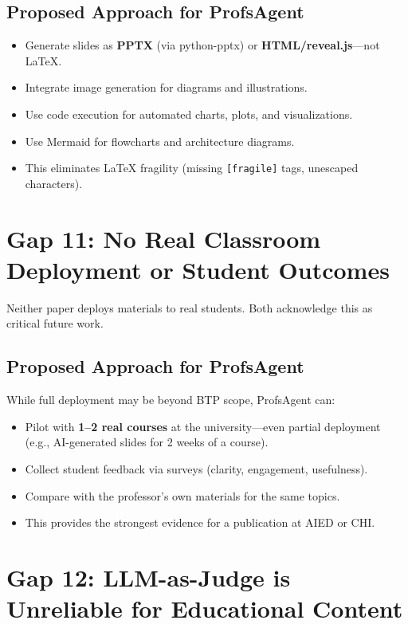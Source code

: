 \documentclass[11pt,a4paper]{article}
\begin{document}
\subsection{Proposed Approach for ProfsAgent}
\begin{itemize}[nosep]
    \item Generate slides as \textbf{PPTX} (via python-pptx) or \textbf{HTML/reveal.js}---not LaTeX.
    \item Integrate image generation for diagrams and illustrations.
    \item Use code execution for automated charts, plots, and visualizations.
    \item Use Mermaid for flowcharts and architecture diagrams.
    \item This eliminates LaTeX fragility (missing \texttt{[fragile]} tags, unescaped characters).
\end{itemize}

\section{Gap 11: No Real Classroom Deployment or Student Outcomes}

Neither paper deploys materials to real students. Both acknowledge this as critical future work.

\subsection{Proposed Approach for ProfsAgent}
While full deployment may be beyond BTP scope, ProfsAgent can:
\begin{itemize}[nosep]
    \item Pilot with \textbf{1--2 real courses} at the university---even partial deployment (e.g., AI-generated slides for 2 weeks of a course).
    \item Collect student feedback via surveys (clarity, engagement, usefulness).
    \item Compare with the professor's own materials for the same topics.
    \item This provides the strongest evidence for a publication at AIED or CHI.
\end{itemize}

\section{Gap 12: LLM-as-Judge is Unreliable for Educational Content}
\end{document}
